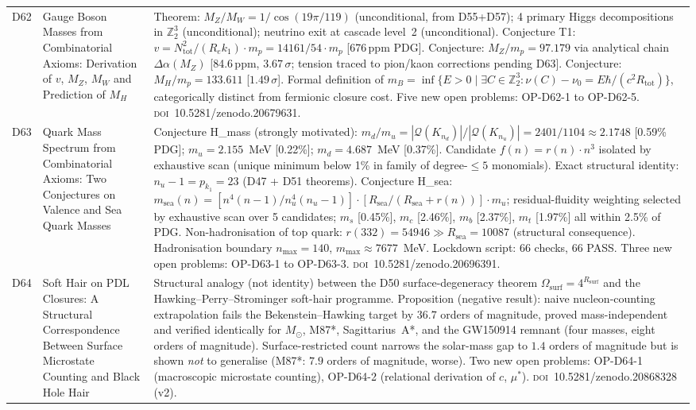 \documentclass[11pt,a4paper]{article}
\theoremstyle{plain}
\theoremstyle{definition}
\theoremstyle{remark}
\newcommand{\Rsurf}{R_{\mathrm{surf}}}
\begin{document}
\begin{longtable}{L{1.3cm}L{3.8cm}L{8.0cm}}
D62 & Gauge Boson Masses from Combinatorial Axioms: Derivation of $v$, $M_Z$, $M_W$ and Prediction of $M_H$~\cite{D62} & \textcolor{proofblue}{Theorem}: $M_Z/M_W = 1/\cos(19\pi/119)$ (unconditional, from D55+D57); 4 primary Higgs decompositions in $\mathbb{Z}_2^3$ (unconditional); neutrino exit at cascade level~2 (unconditional). \textcolor{conjecturegreen}{Conjecture T1}: $v = N_{\mathrm{tot}}^2/(R_e k_1)\cdot m_p = 14161/54\cdot m_p$ [676\,ppm PDG]. \textcolor{conjecturegreen}{Conjecture}: $M_Z/m_p = 97.179$ via analytical chain $\Delta\alpha(M_Z)$ [84.6\,ppm, $3.67\,\sigma$; tension traced to pion/kaon corrections pending D63]. \textcolor{conjecturegreen}{Conjecture}: $M_H/m_p = 133.611$ [$1.49\,\sigma$]. Formal definition of $m_B = \inf\{E>0 \mid \exists C\in\mathbb{Z}_2^3: \nu(C)-\nu_0 = E\hbar/(c^2 R_{\mathrm{tot}})\}$, categorically distinct from fermionic closure cost. Five new open problems: OP-D62-1 to OP-D62-5. \textsc{doi}~10.5281/zenodo.20679631.\\[0.4em]
D63 & Quark Mass Spectrum from Combinatorial Axioms: Two Conjectures on Valence and Sea Quark Masses~\cite{D63} & \textcolor{conjecturegreen}{Conjecture H\_mass} (strongly motivated): $m_d/m_u = |\mathcal{Q}(K_{n_d})|/|\mathcal{Q}(K_{n_u})| = 2401/1104 \approx 2.1748$ [0.59\% PDG]; $m_u = 2.155$~MeV [0.22\%]; $m_d = 4.687$~MeV [0.37\%]. Candidate $f(n)=r(n)\cdot n^3$ isolated by exhaustive scan (unique minimum below 1\% in family of degree-$\leq 5$ monomials). Exact structural identity: $n_u - 1 = p_{k_1} = 23$ (D47 + D51 theorems). \textcolor{conjecturegreen}{Conjecture H\_sea}: $m_{\mathrm{sea}}(n) = [n^4(n-1)/n_u^4(n_u-1)]\cdot[R_{\mathrm{sea}}/(R_{\mathrm{sea}}+r(n))]\cdot m_u$; residual-fluidity weighting selected by exhaustive scan over 5 candidates; $m_s$ [0.45\%], $m_c$ [2.46\%], $m_b$ [2.37\%], $m_t$ [1.97\%] all within 2.5\% of PDG. Non-hadronisation of top quark: $r(332)=54946 \gg R_{\mathrm{sea}}=10087$ (structural consequence). Hadronisation boundary $n_{\max}=140$, $m_{\max}\approx7677$~MeV. Lockdown script: 66 checks, 66 PASS. Three new open problems: OP-D63-1 to OP-D63-3. \textsc{doi}~10.5281/zenodo.20696391.\\[0.4em]
D64 & Soft Hair on PDL Closures: A Structural Correspondence Between Surface Microstate Counting and Black Hole Hair~\cite{D64} & Structural analogy (not identity) between the D50 surface-degeneracy theorem $\Omega_{\mathrm{surf}}=4^{\Rsurf}$ and the Hawking--Perry--Strominger soft-hair programme. \textcolor{proofblue}{Proposition (negative result)}: naive nucleon-counting extrapolation fails the Bekenstein--Hawking target by $36.7$ orders of magnitude, proved mass-independent and verified identically for $M_\odot$, M87*, Sagittarius~A*, and the GW150914 remnant (four masses, eight orders of magnitude). Surface-restricted count narrows the solar-mass gap to $1.4$ orders of magnitude but is shown \emph{not} to generalise (M87*: $7.9$ orders of magnitude, worse). Two new open problems: OP-D64-1 (macroscopic microstate counting), OP-D64-2 (relational derivation of $c$, $\mu^*$). \textsc{doi}~10.5281/zenodo.20868328 (v2).\\[0.4em]

\end{longtable}
\end{document}
